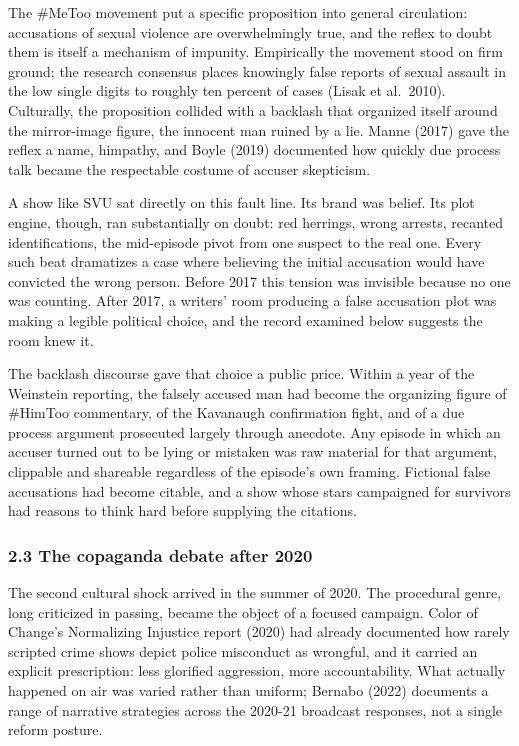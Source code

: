 \documentclass[
]{article}
\begin{document}
The \#MeToo movement put a specific proposition into general
circulation: accusations of sexual violence are overwhelmingly true, and
the reflex to doubt them is itself a mechanism of impunity. Empirically
the movement stood on firm ground; the research consensus places
knowingly false reports of sexual assault in the low single digits to
roughly ten percent of cases (Lisak et al.~2010). Culturally, the
proposition collided with a backlash that organized itself around the
mirror-image figure, the innocent man ruined by a lie. Manne (2017) gave
the reflex a name, himpathy, and Boyle (2019) documented how quickly due
process talk became the respectable costume of accuser skepticism.

A show like SVU sat directly on this fault line. Its brand was belief.
Its plot engine, though, ran substantially on doubt: red herrings, wrong
arrests, recanted identifications, the mid-episode pivot from one
suspect to the real one. Every such beat dramatizes a case where
believing the initial accusation would have convicted the wrong person.
Before 2017 this tension was invisible because no one was counting.
After 2017, a writers' room producing a false accusation plot was making
a legible political choice, and the record examined below suggests the
room knew it.

The backlash discourse gave that choice a public price. Within a year of
the Weinstein reporting, the falsely accused man had become the
organizing figure of \#HimToo commentary, of the Kavanaugh confirmation
fight, and of a due process argument prosecuted largely through
anecdote. Any episode in which an accuser turned out to be lying or
mistaken was raw material for that argument, clippable and shareable
regardless of the episode's own framing. Fictional false accusations had
become citable, and a show whose stars campaigned for survivors had
reasons to think hard before supplying the citations.

\subsubsection{2.3 The copaganda debate after
2020}\label{the-copaganda-debate-after-2020}

The second cultural shock arrived in the summer of 2020. The procedural
genre, long criticized in passing, became the object of a focused
campaign. Color of Change's Normalizing Injustice report (2020) had
already documented how rarely scripted crime shows depict police
misconduct as wrongful, and it carried an explicit prescription: less
glorified aggression, more accountability. What actually happened on air
was varied rather than uniform; Bernabo (2022) documents a range of
narrative strategies across the 2020-21 broadcast responses, not a
single reform posture.
\end{document}
